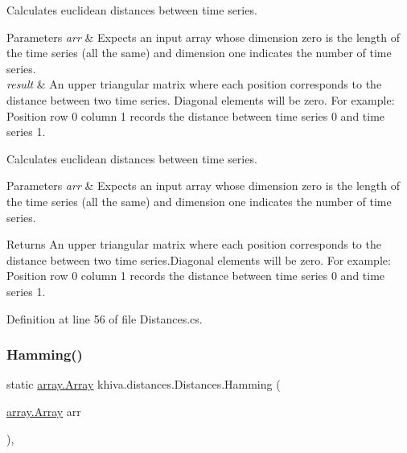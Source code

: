 Calculates euclidean distances between time series. 


\begin{DoxyParams}{Parameters}
{\em arr} & Expects an input array whose dimension zero is the length of the time series (all the same) and dimension one indicates the number of time series.\\
\hline
{\em result} & An upper triangular matrix where each position corresponds to the distance between two time series. Diagonal elements will be zero. For example\+: Position row 0 column 1 records the distance between time series 0 and time series 1.\\
\hline
\end{DoxyParams}
Calculates euclidean distances between time series. 


\begin{DoxyParams}{Parameters}
{\em arr} & Expects an input array whose dimension zero is the length of the time series (all the same) and dimension one indicates the number of time series.\\
\hline
\end{DoxyParams}
\begin{DoxyReturn}{Returns}
An upper triangular matrix where each position corresponds to the distance between two time series.\+Diagonal elements will be zero. For example\+: Position row 0 column 1 records the distance between time series 0 and time series 1.
\end{DoxyReturn}


Definition at line 56 of file Distances.\+cs.

\mbox{\label{classkhiva_1_1distances_1_1_distances_a88646f3ee47c7e0d91610d6c27685fee}} 
\subsubsection{\texorpdfstring{Hamming()}{Hamming()}}
{\footnotesize\ttfamily static \mbox{\hyperlink{classkhiva_1_1array_1_1_array}{array.\+Array}} khiva.\+distances.\+Distances.\+Hamming (\begin{DoxyParamCaption}\item[{\mbox{\hyperlink{classkhiva_1_1array_1_1_array}{array.\+Array}}}]{arr }\end{DoxyParamCaption})\hspace{0.3cm}{\ttfamily [inline]}, {\ttfamily [static]}}



